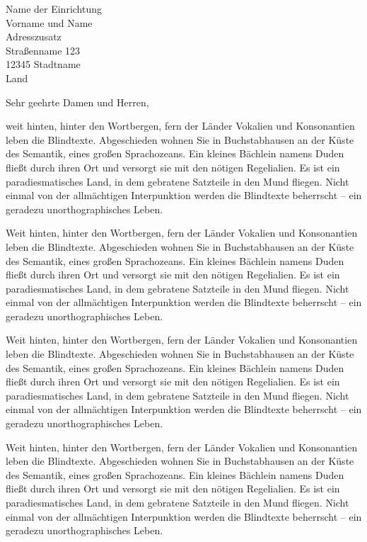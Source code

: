 \documentclass[unijena]{scrlttr2}
\begin{document}
\begin{letter}{%
Name der Einrichtung\\
Vorname und Name\\
Adresszusatz\\
Straßenname 123\\
12345 Stadtname\\
Land
}

\opening{Sehr geehrte Damen und Herren,}

weit hinten, hinter den Wortbergen, fern der Länder Vokalien und Konsonantien
leben die Blindtexte. Abgeschieden wohnen Sie in Buchstabhausen an der Küste
des Semantik, eines großen Sprachozeans. Ein kleines Bächlein namens Duden
fließt durch ihren Ort und versorgt sie mit den nötigen Regelialien. Es ist
ein paradiesmatisches Land, in dem gebratene Satzteile in den Mund
fliegen. Nicht einmal von der allmächtigen Interpunktion werden die Blindtexte
beherrscht – ein geradezu unorthographisches Leben.

Weit hinten, hinter den Wortbergen, fern der Länder Vokalien und Konsonantien
leben die Blindtexte. Abgeschieden wohnen Sie in Buchstabhausen an der Küste
des Semantik, eines großen Sprachozeans. Ein kleines Bächlein namens Duden
fließt durch ihren Ort und versorgt sie mit den nötigen Regelialien. Es ist
ein paradiesmatisches Land, in dem gebratene Satzteile in den Mund
fliegen. Nicht einmal von der allmächtigen Interpunktion werden die Blindtexte
beherrscht – ein geradezu unorthographisches Leben.

Weit hinten, hinter den Wortbergen, fern der Länder Vokalien und Konsonantien
leben die Blindtexte. Abgeschieden wohnen Sie in Buchstabhausen an der Küste
des Semantik, eines großen Sprachozeans. Ein kleines Bächlein namens Duden
fließt durch ihren Ort und versorgt sie mit den nötigen Regelialien. Es ist
ein paradiesmatisches Land, in dem gebratene Satzteile in den Mund
fliegen. Nicht einmal von der allmächtigen Interpunktion werden die Blindtexte
beherrscht – ein geradezu unorthographisches Leben.

Weit hinten, hinter den Wortbergen, fern der Länder Vokalien und Konsonantien
leben die Blindtexte. Abgeschieden wohnen Sie in Buchstabhausen an der Küste
des Semantik, eines großen Sprachozeans. Ein kleines Bächlein namens Duden
fließt durch ihren Ort und versorgt sie mit den nötigen Regelialien. Es ist
ein paradiesmatisches Land, in dem gebratene Satzteile in den Mund
fliegen. Nicht einmal von der allmächtigen Interpunktion werden die Blindtexte
beherrscht – ein geradezu unorthographisches Leben.


\end{letter}
\end{document}
